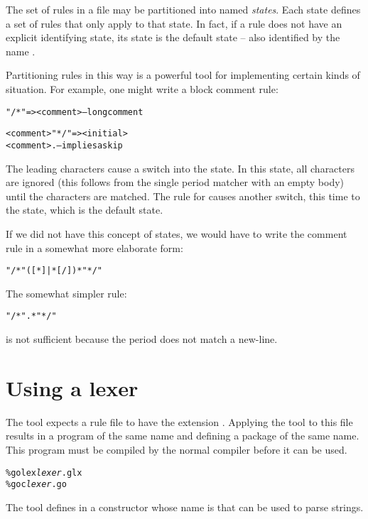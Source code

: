 The set of rules in a \golex file may be partitioned into named \emph{states}. Each state defines a set of rules that only apply to that state. In fact, if a rule does not have an explicit identifying state, its state is the default state -- also identified by the name .

Partitioning rules in this way is a powerful tool for implementing certain kinds of situation. For example, one might write a block comment rule:
\begin{alltt}
 "/*" => <comment>        	-- long comment

  <comment> "*/" => <initial>
  <comment> .	         	-- implies a skip
\end{alltt}
The leading \q{/*} characters cause a switch into the  state. In this state, all characters are ignored (this follows from the single period matcher with an empty body) until the \q{*/} characters are matched. The rule for \q{*/} causes another switch, this time to the  state, which is the default state.

If we did not have this concept of states, we would have to write the comment rule in a somewhat more elaborate form:
\begin{alltt}
"/*"([\upht{}*]|\bsl{}*[\upht{}/])*"*/"
\end{alltt}
\begin{aside}
The somewhat simpler rule:
\begin{alltt}
"/*".*"*/"
\end{alltt}
is not sufficient because the period  does not match a new-line.
\end{aside}

\section{Using a \golex lexer}
The \golex tool expects a rule file to have the extension . Applying the \golex tool to this file results in a \go program of the same name and defining a package of the same name. This program must be compiled by the normal \go compiler before it can be used.

\begin{alltt}
\% golex \emph{lexer}.glx
\% goc \emph{lexer}.go
\end{alltt}

The \golex tool defines in  a constructor whose name is  that can be used to parse strings.

